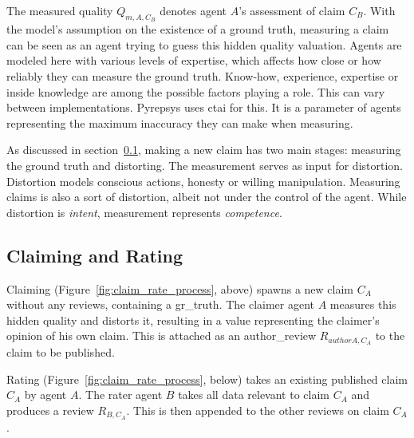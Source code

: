 \documentclass[%
    ]{\PathToTumTemplate/thesis/tum_thesis}
\begin{document}
The measured quality $Q_{m,A,C_{B}}$ denotes agent $A$'s assessment of claim $C_B$.
With the model's assumption on the existence of a ground truth, measuring a claim can be seen as an agent trying to guess this hidden quality valuation.
Agents are modeled here with various levels of expertise, which affects how close or how reliably they can measure the ground truth.
Know-how, experience, expertise or inside knowledge are among the possible factors playing a role.
This can vary between implementations.
Pyrepsys uses \acrlong{ctai} for this.
It is a parameter of agents representing the maximum inaccuracy they can make when measuring.

As discussed in section~\ref{sec:appr_claim_rate_process}, making a new claim has two main stages: measuring the ground truth and distorting.
The measurement serves as input for distortion.
Distortion models conscious actions, honesty or willing manipulation.
Measuring claims is also a sort of distortion, albeit not under the control of the agent.
While distortion is \emph{intent}, measurement represents \emph{competence}.


\subsection{Claiming and Rating}\label{sec:appr_claim_rate_process}
Claiming (Figure~\ref{fig:claim_rate_process}, above) spawns a new claim $C_A$ without any reviews, containing a \gls{gr_truth}.
The claimer agent $A$ measures this hidden quality and distorts it, resulting in a value representing the claimer's opinion of his own claim.
This is attached as an \gls{author_review} $R_{authorA,C_{A}}$ to the claim to be published.

Rating (Figure~\ref{fig:claim_rate_process}, below) takes an existing published claim $C_A$ by agent $A$.
The rater agent $B$ takes all data relevant to claim $C_A$ and produces a \gls{review} $R_{B,C_{A}}$.
This is then appended to the other reviews on claim $C_A$.
\end{document}
